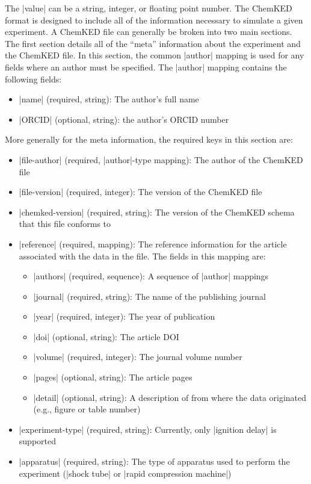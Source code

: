 \documentclass[12pt]{ijck}
\newcommand\ck{ChemKED}
\begin{document}
The \yabox|value| can be a string, integer, or floating point number. The \ck{}
format is designed to include all of the information necessary to simulate a
given experiment. A \ck{} file can generally be broken into two main sections.
The first section details all of the ``meta'' information about the experiment
and the \ck{} file. In this section, the common \yabox|author| mapping is used
for any fields where an author must be specified. The \yabox|author| mapping
contains the following fields:
%
\begin{itemize}
    \item \yabox|name| (required, string): The author's full name
    \item \yabox|ORCID| (optional, string): the author's ORCID number
\end{itemize}
%
More generally for the meta information, the required keys in this section
are:
%
\begin{itemize}
    \item \yabox|file-author| (required, \yabox|author|-type mapping): The
    author of the \ck{} file
    \item \yabox|file-version| (required, integer): The version of the \ck{}
    file
    \item \yabox|chemked-version| (required, string): The version of the \ck{}
    schema that this file conforms to
    \item \yabox|reference| (required, mapping): The reference information for
    the article associated with the data in the file. The fields in this
    mapping are:
    \begin{itemize}
        \item \yabox|authors| (required, sequence): A sequence of \yabox|author|
        mappings
        \item \yabox|journal| (required, string): The name of the publishing
        journal
        \item \yabox|year| (required, integer): The year of publication
        \item \yabox|doi| (optional, string): The article DOI
        \item \yabox|volume| (required, integer): The journal volume number
        \item \yabox|pages| (optional, string): The article pages
        \item \yabox|detail| (optional, string): A description of from where the
        data originated (e.g., figure or table number)
    \end{itemize}
    \item \yabox|experiment-type| (required, string): Currently, only
    \yabox|ignition delay| is supported
    \item \yabox|apparatus| (required, string): The type of apparatus used to
    perform the experiment (\yabox|shock tube| or \yabox|rapid compression machine|)
\end{itemize}
\end{document}
